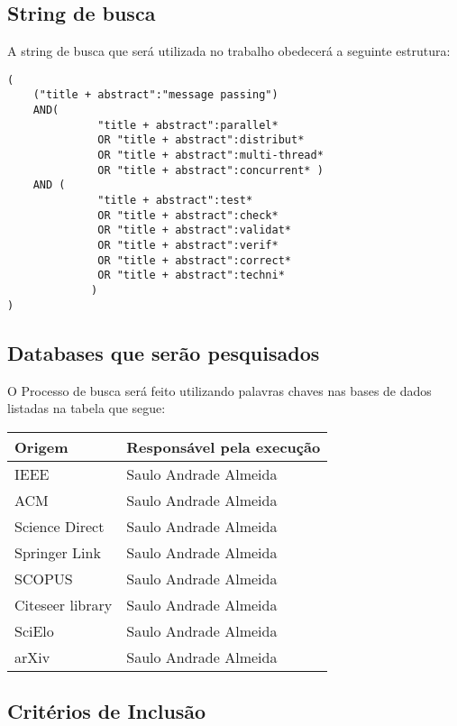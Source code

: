 \subsection{String de busca}

A string de busca que será utilizada no trabalho obedecerá a seguinte estrutura:


\begin{verbatim}
(
    ("title + abstract":"message passing")  
    AND(
              "title + abstract":parallel*
              OR "title + abstract":distribut*
              OR "title + abstract":multi-thread*
              OR "title + abstract":concurrent* ) 
    AND (
              "title + abstract":test* 
              OR "title + abstract":check*
              OR "title + abstract":validat* 
              OR "title + abstract":verif*
              OR "title + abstract":correct*
              OR "title + abstract":techni*
             )
)    
\end{verbatim}

\subsection{Databases que serão pesquisados}  \label{subsec:repositoriosPesquisa}

O Processo de busca será feito utilizando palavras chaves nas bases de dados listadas na tabela que segue:

\begin{center}
\begin{tabular}{ |p{4cm}|p{7cm}|  }
\hline
\textbf{Origem} & \textbf{Responsável pela execução} \\
\hline
IEEE & Saulo Andrade Almeida \\ 
\hline
ACM & Saulo Andrade Almeida \\ 
\hline
Science Direct & Saulo Andrade Almeida \\ 
\hline
Springer Link & Saulo Andrade Almeida \\ 
\hline
SCOPUS & Saulo Andrade Almeida \\ 
\hline
Citeseer library & Saulo Andrade Almeida \\ 
\hline
SciElo & Saulo Andrade Almeida \\ 
\hline
arXiv & Saulo Andrade Almeida \\ 
\hline
\end{tabular}
\end{center}


\subsection{Critérios de Inclusão}

